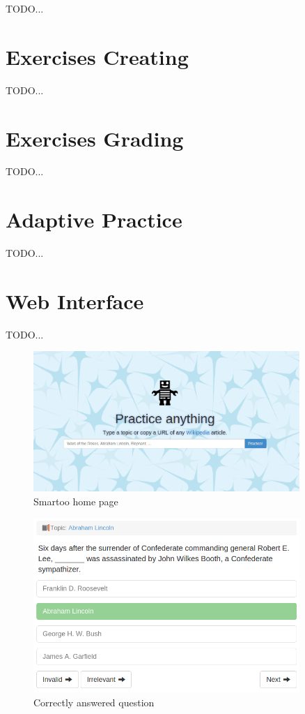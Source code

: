 \documentclass[a4paper, 12pt, twoside]{fithesis2}		%
\renewcommand{\_}{\leavevmode \kern0.0em\vbox{\hrule width0.4em}}
\begin{document}
TODO...

\section{Exercises Creating}
\label{sec:smartoo-exercises}

TODO...

\section{Exercises Grading}
\label{sec:smartoo-exercises-grading}

TODO...

\section{Adaptive Practice}
\label{sec:smartoo-practice}


TODO...

\section{Web Interface}
\label{sec:smartoo-web}

TODO...

\begin{figure}[h]
  \centering
  \includegraphics[width=0.9\textwidth]{images/home-page.png}
  \caption{Smartoo home page}
  \label{fig:smartoo-home}
\end{figure}

\begin{figure}[h]
  \centering
  \includegraphics[width=0.9\textwidth]{images/answered-correctly.png}
  \caption{Correctly answered question}
  \label{fig:correctly-answered-question}
\end{figure}
\end{document}
